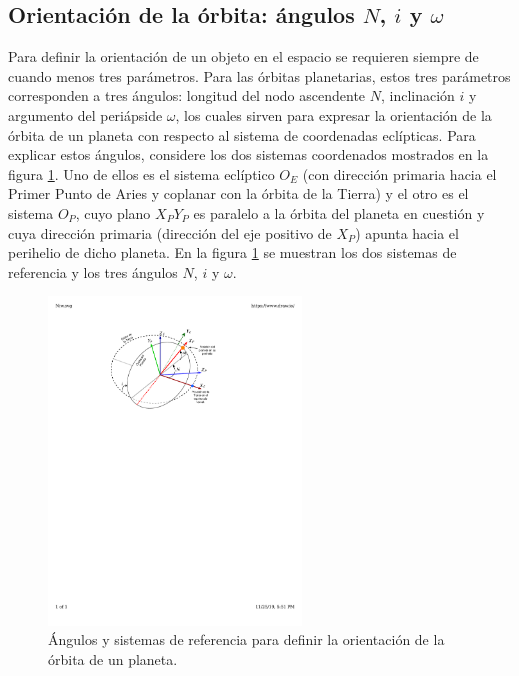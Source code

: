 \documentclass[a4paper,10pt]{article}
\begin{document}
\subsection{Orientación de la órbita: ángulos $N$, $i$ y $\omega$}
Para definir la orientación de un objeto en el espacio se requieren siempre de cuando menos tres parámetros. Para las órbitas planetarias, estos tres parámetros corresponden a tres ángulos: longitud del nodo ascendente $N$, inclinación $i$ y argumento del periápside $\omega$, los cuales sirven para expresar la orientación de la órbita de un planeta con respecto al sistema de coordenadas eclípticas. Para explicar estos ángulos, considere los dos sistemas coordenados mostrados en la figura \ref{fig:Niw}. Uno de ellos es el sistema eclíptico $O_E$ (con dirección primaria hacia el Primer Punto de Aries y coplanar con la órbita de la Tierra) y el otro es el sistema $O_P$, cuyo plano $X_P Y_P$ es paralelo a la órbita del planeta en cuestión y cuya dirección primaria (dirección del eje positivo de $X_P$) apunta hacia el perihelio de dicho planeta. En la figura \ref{fig:Niw} se muestran los dos sistemas de referencia y los tres ángulos $N$, $i$ y $\omega$.

\begin{figure}
  \centering
  \includegraphics[width=0.6\textwidth]{Figures/Niw.pdf}
  \caption{Ángulos y sistemas de referencia para definir la orientación de la órbita de un planeta.}
  \label{fig:Niw}
\end{figure}
\end{document}
